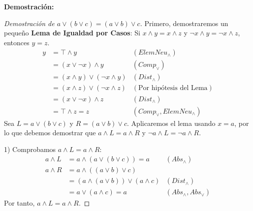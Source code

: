 \documentclass[12pt,a4paper]{article}
\newcommand{\desplegable}[2]{%
  \par\vspace{1ex}\noindent
  \textbf{Demostración:}
  \vspace{1ex}
  
  #2
  \par\vspace{1ex}
}
\begin{document}
\desplegable{proof_asociatividad}{
\begin{proof}[Demostración de $a \vee (b \vee c) = (a \vee b) \vee c$]
Primero, demostraremos un pequeño \textbf{Lema de Igualdad por Casos}: Si $x \wedge y = x \wedge z$ y $\neg x \wedge y = \neg x \wedge z$, entonces $y = z$.
\begin{align*}
    y &= \top \wedge y & (ElemNeu_\wedge) \\
      &= (x \vee \neg x) \wedge y & (Comp_\vee) \\
      &= (x \wedge y) \vee (\neg x \wedge y) & (Dist_\wedge) \\
      &= (x \wedge z) \vee (\neg x \wedge z) & (\text{Por hipótesis del Lema}) \\
      &= (x \vee \neg x) \wedge z & (Dist_\wedge) \\
      &= \top \wedge z = z & (Comp_\vee, ElemNeu_\wedge)
\end{align*}
Sea $L = a \vee (b \vee c)$ y $R = (a \vee b) \vee c$. Aplicaremos el lema usando $x = a$, por lo que debemos demostrar que $a \wedge L = a \wedge R$ y $\neg a \wedge L = \neg a \wedge R$.

1) Comprobamos $a \wedge L = a \wedge R$:
\begin{align*}
    a \wedge L &= a \wedge (a \vee (b \vee c)) = a & (Abs_\wedge) \\
    a \wedge R &= a \wedge ((a \vee b) \vee c) \\
               &= (a \wedge (a \vee b)) \vee (a \wedge c) & (Dist_\wedge) \\
               &= a \vee (a \wedge c) = a & (Abs_\wedge, Abs_\vee)
\end{align*}
Por tanto, $a \wedge L = a \wedge R$.


\end{proof}}
\end{document}

